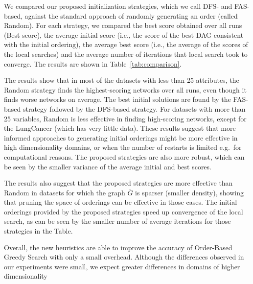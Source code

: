 We compared our proposed initialization strategies, which we call DFS- and FAS-based, against the standard approach of randomly generating an order (called Random). For each strategy, we compared the best score obtained over all runs (Best score), the average initial score (i.e., the score of the best DAG consistent with the initial ordering), the average best score (i.e., the average of the scores of the local searches) and the average number of iterations that local search took to converge. The results are shown in Table~\ref{tab:comparison}.
	
The results show that in most of the datasets with less than 25 attributes, the Random strategy finds the highest-scoring networks over all runs, even though it finds worse networks on average. The best initial solutions are found by the FAS-based strategy followed by the DFS-based strategy. For datasets with more than 25 variables, Random is less effective in finding high-scoring networks, except for the LungCancer (which has very little data). These results suggest that more informed approaches to generating initial orderings might be more effective in high dimensionality domains, or when the number of restarts is limited e.g.~for computational reasons. The proposed strategies are also more robust, which can be seen by the smaller variance of the average initial and best scores. 

The results also suggest that the proposed strategies are more effective than Random in datasets for which the graph $\overline G$ is sparser (smaller  density), showing that pruning the space of orderings can be effective in those cases. The initial orderings provided by the proposed strategies speed up convergence of the local search, as can be seen by the smaller number of average iterations for those strategies in the Table.

Overall, the new heuristics are able to improve the accuracy of Order-Based Greedy Search with only a small overhead. Although the differences observed in our experiments were small, we expect greater differences in domains of higher dimensionality


% 
